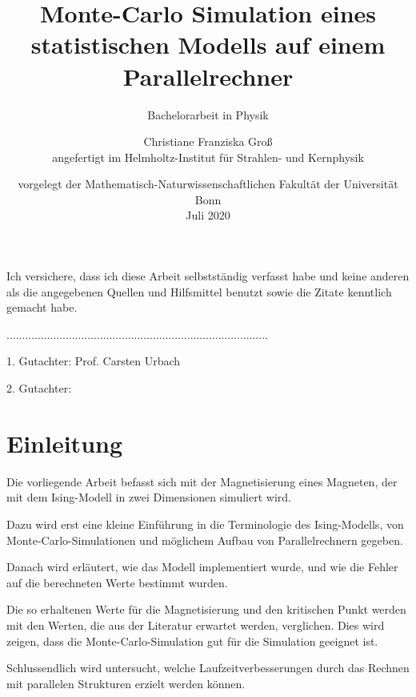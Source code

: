 \documentclass{scrreprt}
\title{Monte-Carlo Simulation eines statistischen Modells auf einem Parallelrechner}
\subtitle{Bachelorarbeit in Physik}
\date{vorgelegt der Mathematisch-Naturwissenschaftlichen Fakultät der Universität Bonn \\ Juli 2020}
\author{Christiane Franziska Groß\\ angefertigt im Helmholtz-Institut für Strahlen- und Kernphysik}
\begin{document}
	\maketitle
	
	
	Ich versichere, dass ich diese Arbeit selbstständig verfasst habe und keine anderen als die angegebenen Quellen und Hilfsmittel benutzt sowie die Zitate kenntlich gemacht habe.

	\vspace{2cm}
	
	....................................................................................
	
	\vspace{5cm}	
	
	1. Gutachter: Prof. Carsten Urbach
	
	2. Gutachter: 
	
	\newpage
	
	\tableofcontents
	
	\clearpage
	
	
	\section*{Einleitung}
	
	
	Die vorliegende Arbeit befasst sich mit der Magnetisierung eines Magneten, der mit dem Ising-Modell in zwei Dimensionen simuliert wird. 
	
	Dazu wird erst eine kleine Einführung in die Terminologie des Ising-Modells, von Monte-Carlo-Simulationen und möglichem Aufbau von Parallelrechnern gegeben.
	
	Danach wird erläutert, wie das Modell implementiert wurde, und wie die Fehler auf die berechneten Werte bestimmt wurden.
	
	Die so erhaltenen Werte für die Magnetisierung und den kritischen Punkt werden mit den Werten, die aus der Literatur erwartet werden, verglichen. Dies wird zeigen, dass die Monte-Carlo-Simulation gut für die Simulation geeignet ist.
	
	Schlussendlich wird untersucht, welche Laufzeitverbesserungen durch das Rechnen mit parallelen Strukturen erzielt werden können. 
	
\end{document}
